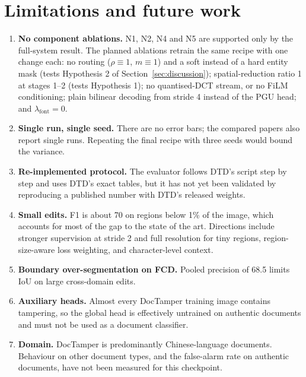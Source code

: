 \documentclass[11pt,a4paper]{article}
\begin{document}
\section{Limitations and future work}\label{sec:limits}
\begin{enumerate}
  \item \textbf{No component ablations.} N1, N2, N4 and N5 are supported only by the full-system
        result. The planned ablations retrain the same recipe with one change each: no routing
        ($\rho\equiv1$, $m\equiv1$) and a soft instead of a hard entity mask (tests Hypothesis 2 of
        Section~\ref{sec:discussion}); spatial-reduction ratio 1 at stages 1--2 (tests
        Hypothesis 1); no quantised-DCT stream, or no FiLM conditioning; plain bilinear decoding
        from stride 4 instead of the PGU head; and $\lambda_{\mathrm{font}}=0$.
  \item \textbf{Single run, single seed.} There are no error bars; the compared papers also report
        single runs. Repeating the final recipe with three seeds would bound the variance.
  \item \textbf{Re-implemented protocol.} The evaluator follows DTD's script step by step and uses
        DTD's exact tables, but it has not yet been validated by reproducing a published number
        with DTD's released weights.
  \item \textbf{Small edits.} F1 is about 70 on regions below 1\% of the image, which accounts for
        most of the gap to the state of the art. Directions include stronger supervision at
        stride 2 and full resolution for tiny regions, region-size-aware loss weighting, and
        character-level context.
  \item \textbf{Boundary over-segmentation on FCD.} Pooled precision of 68.5 limits IoU on
        large cross-domain edits.
  \item \textbf{Auxiliary heads.} Almost every DocTamper training image contains tampering, so the
        global head is effectively untrained on authentic documents and must not be used as a
        document classifier.
  \item \textbf{Domain.} DocTamper is predominantly Chinese-language documents. Behaviour on other
        document types, and the false-alarm rate on authentic documents, have not been measured
        for this checkpoint.
\end{enumerate}

\end{document}
